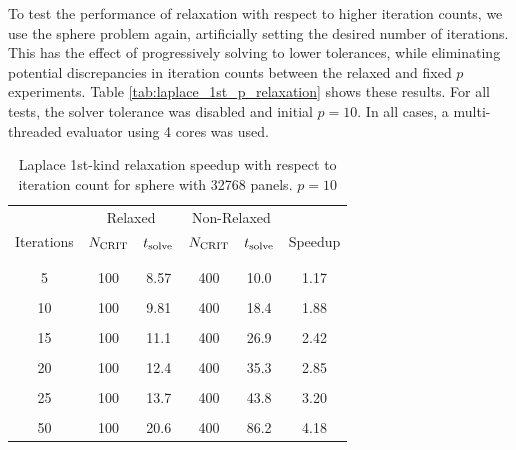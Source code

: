 
To test the performance of relaxation with respect to higher iteration counts, we use the sphere problem again, artificially setting the desired number of {\gmres} iterations. This has the effect of progressively solving to lower tolerances, while eliminating potential discrepancies in iteration counts between the relaxed and fixed $p$ experiments. Table \ref{tab:laplace_1st_p_relaxation} shows these results. For all tests, the solver tolerance was disabled and initial $p = 10$. In all cases, a multi-threaded evaluator using 4 cores was used.

\begin{table}[H]
\begin{center}
\begin{tabular}{c|cc|cc|c}
  & \multicolumn{2}{c|}{Relaxed} & \multicolumn{2}{c|}{Non-Relaxed} & \\
  Iterations & $N_{\text{CRIT}}$ & $t_{\text{solve}}$ & $N_{\text{CRIT}}$ & $t_{\text{solve}}$ & Speedup \\
   & & & & & \\ \hline
   & & & & & \\
  5 & 100 & 8.57 & 400 & 10.0 & 1.17 \\
   & & & & &  \\
  10 & 100 & 9.81 & 400 & 18.4 & 1.88 \\
   & & & & & \\
  15 & 100 & 11.1 & 400 & 26.9 & 2.42 \\
   & & & & & \\
  20 & 100 & 12.4 & 400 & 35.3 & 2.85 \\
   & & & & & \\
  25 & 100 & 13.7 & 400 & 43.8 & 3.20 \\
   & & & & & \\
  50 & 100 & 20.6 & 400 & 86.2 & 4.18 \\
 
\end{tabular}
\end{center}
\caption{Laplace 1st-kind relaxation speedup with respect to iteration count for sphere with 32768 panels. $p=10$}
\label{tab:laplace_1st_iterations_relaxation}
\end{table}%

